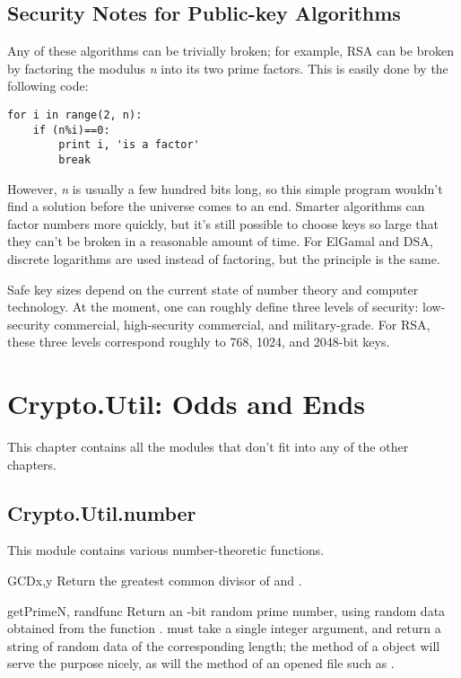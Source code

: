\documentclass{howto}
\begin{document}
\subsection{Security Notes for Public-key Algorithms}
Any of these algorithms can be trivially broken; for example, RSA can be
broken by factoring the modulus \emph{n} into its two prime factors.
This is easily done by the following code:

\begin{verbatim}
for i in range(2, n):
    if (n%i)==0:
        print i, 'is a factor'
        break
\end{verbatim}

However, \emph{n} is usually a few hundred bits long, so this simple
program wouldn't find a solution before the universe comes to an end.
Smarter algorithms can factor numbers more quickly, but it's still
possible to choose keys so large that they can't be broken in a
reasonable amount of time.  For ElGamal and DSA, discrete logarithms are
used instead of factoring, but the principle is the same.

Safe key sizes depend on the current state of number theory and
computer technology.  At the moment, one can roughly define three
levels of security: low-security commercial, high-security commercial,
and military-grade.  For RSA, these three levels correspond roughly to
768, 1024, and 2048-bit keys.


\section{Crypto.Util: Odds and Ends}
This chapter contains all the modules that don't fit into any of the
other chapters.

\subsection{Crypto.Util.number}

This module contains various number-theoretic functions.

\begin{funcdesc}{GCD}{x,y}
Return the greatest common divisor of  and .
\end{funcdesc}

\begin{funcdesc}{getPrime}{N, randfunc}
Return an -bit random prime number, using random data obtained
from the function .   must take a single
integer argument, and return a string of random data of the
corresponding length; the  method of a
 object will serve the purpose nicely, as will the
 method of an opened file such as .
\end{funcdesc}
\end{document}
